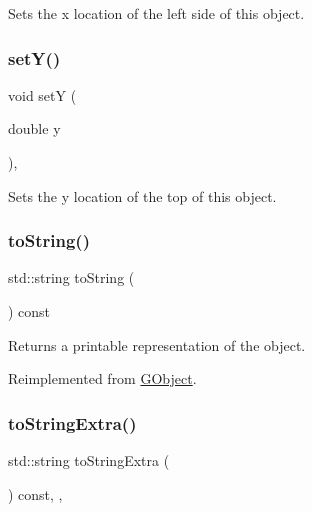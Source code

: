 Sets the x location of the left side of this object. 

\mbox{\label{classGObject_a7d57e2a5c35d27feb58fd498a3cf82b9}} 
\subsubsection{\texorpdfstring{set\+Y()}{setY()}}
{\footnotesize\ttfamily void setY (\begin{DoxyParamCaption}\item[{double}]{y }\end{DoxyParamCaption})\hspace{0.3cm}{\ttfamily [virtual]}, {\ttfamily [inherited]}}



Sets the y location of the top of this object. 

\mbox{\label{classGCompound_add86bda25fd0c3b8edaedee9431b85e6}} 
\subsubsection{\texorpdfstring{to\+String()}{toString()}}
{\footnotesize\ttfamily std\+::string to\+String (\begin{DoxyParamCaption}{ }\end{DoxyParamCaption}) const\hspace{0.3cm}{\ttfamily [virtual]}}



Returns a printable representation of the object. 



Reimplemented from \mbox{\hyperlink{classGObject_a1fe5121d6528fdea3f243321b3fa3a49}{G\+Object}}.

\mbox{\label{classGObject_a4fcdf8de5c6de92242a975d83d8f23ea}} 
\subsubsection{\texorpdfstring{to\+String\+Extra()}{toStringExtra()}}
{\footnotesize\ttfamily std\+::string to\+String\+Extra (\begin{DoxyParamCaption}{ }\end{DoxyParamCaption}) const\hspace{0.3cm}{\ttfamily [protected]}, {\ttfamily [virtual]}, {\ttfamily [inherited]}}



